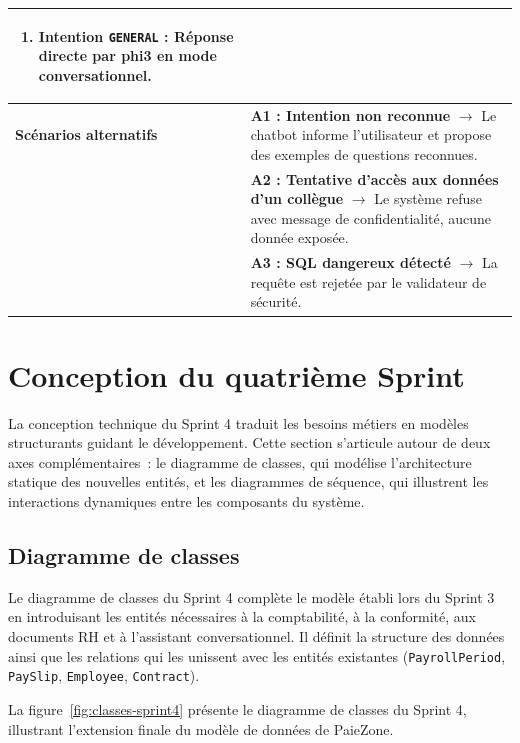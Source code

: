 \begin{xltabular}{\textwidth}{|l|X|}
\begin{enumerate}[nosep, leftmargin=*]
        \item \textbf{Intention \texttt{GENERAL}} : Réponse directe par phi3 en mode conversationnel.
    \end{enumerate} \\ \hline
\textbf{Scénarios alternatifs}
& \textbf{A1 : Intention non reconnue} $\rightarrow$ Le chatbot informe l'utilisateur et propose des exemples de questions reconnues. \\ 
& \textbf{A2 : Tentative d'accès aux données d'un collègue} $\rightarrow$ Le système refuse avec message de confidentialité, aucune donnée exposée. \\ 
& \textbf{A3 : SQL dangereux détecté} $\rightarrow$ La requête est rejetée par le validateur de sécurité. \\
\end{xltabular}

\section{Conception du quatrième Sprint}
\label{sec:s4-conception}

La conception technique du Sprint 4 traduit les besoins métiers en
modèles structurants guidant le développement. Cette section s'articule
autour de deux axes complémentaires~: le diagramme de classes, qui
modélise l'architecture statique des nouvelles entités, et les
diagrammes de séquence, qui illustrent les interactions dynamiques
entre les composants du système.

\subsection{Diagramme de classes}
\label{sec:s4-classes}

Le diagramme de classes du Sprint 4 complète le modèle établi lors du
Sprint 3 en introduisant les entités nécessaires à la comptabilité, à
la conformité, aux documents RH et à l'assistant conversationnel.
Il définit la structure des données ainsi que les relations qui les
unissent avec les entités existantes (\texttt{PayrollPeriod},
\texttt{PaySlip}, \texttt{Employee}, \texttt{Contract}).

La figure~\ref{fig:classes-sprint4} présente le diagramme de classes
du Sprint 4, illustrant l'extension finale du modèle de données de
PaieZone.

